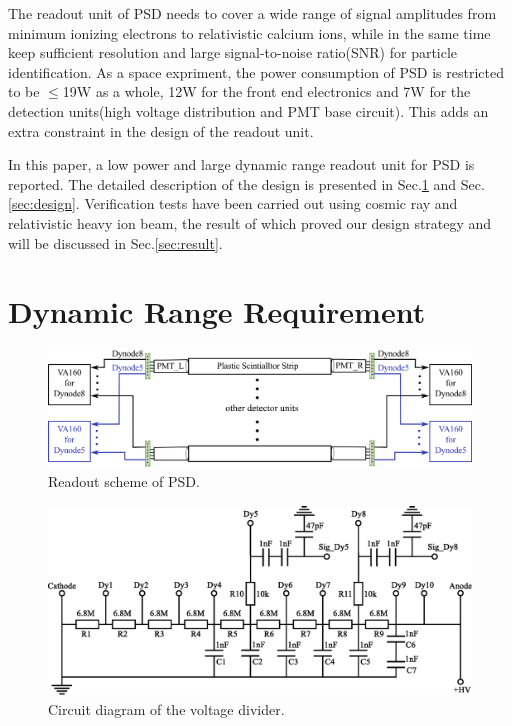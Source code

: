 \documentclass[5p, times]{elsarticle}
\begin{document}
The readout unit of PSD needs to cover a wide range of signal amplitudes from minimum ionizing electrons to relativistic calcium ions, while in the same time keep sufficient resolution and large signal-to-noise ratio(SNR) for particle identification.   
As a space expriment, the power consumption of PSD is restricted to be $\leq$19W as a whole, 12W for the front end electronics and 7W for the detection units(high voltage distribution and PMT base circuit).
This adds an extra constraint in the design of the readout unit.

In this paper, a low power and large dynamic range readout unit for PSD is reported.
The detailed description of the design is presented in Sec.\ref{sec:requirement} and Sec.\ref{sec:design}.
Verification tests have been carried out using cosmic ray and relativistic heavy ion beam, the result of which proved our design strategy and will be discussed in Sec.\ref{sec:result}.

\section{Dynamic Range Requirement}
\label{sec:requirement}

\begin{figure}
\centering
 \includegraphics[width=140mm]{readout_scheme}
\caption{Readout scheme of PSD.}
\label{fig:readout_scheme}
\end{figure} 

\begin{figure}
\centering
 \includegraphics[width=140mm]{divider}
\caption{Circuit diagram of the voltage divider.}
\label{fig:divider}
\end{figure} 
\end{document}
